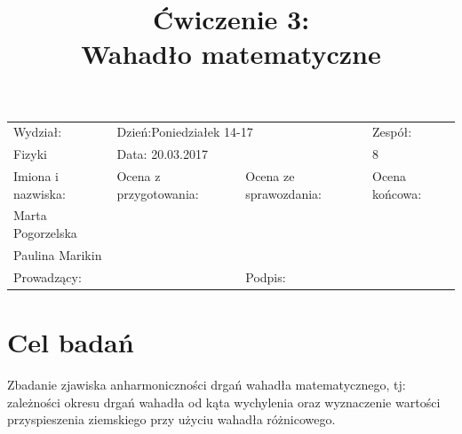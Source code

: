\documentclass[a4paper,10pt]{article}
\def\arraystretch{1}
\begin{document}
\begin{table}
  \centering
  \def\arraystretch{1.5}
    \begin{tabular}{|l|l|l|l|} \hline
    Wydział:           & \multicolumn{2}{l|}{Dzień:Poniedziałek 14-17}    &Zespół:  \\
    Fizyki             &    \multicolumn{2}{l|}{Data: 20.03.2017}         &8             \\\hline
    Imiona i nazwiska: &Ocena z przygotowania:  &Ocena ze sprawozdania:   &Ocena końcowa: \\
    Marta Pogorzelska  &                        &                         &                \\
    Paulina Marikin    &                        &                         &\\\hline
    \multicolumn{2}{|l|}{Prowadzący:                 } &\multicolumn{2}{l|}{Podpis:             }  \\\hline
  \end{tabular}
\end{table}


\title{Ćwiczenie 3:\\Wahadło matematyczne}
\date{}
\maketitle{}

\section{Cel badań}
Zbadanie zjawiska anharmoniczności drgań wahadła matematycznego, tj: zależności okresu drgań wahadła od kąta wychylenia oraz wyznaczenie wartości przyspieszenia ziemskiego przy użyciu wahadła różnicowego.
\end{document}
